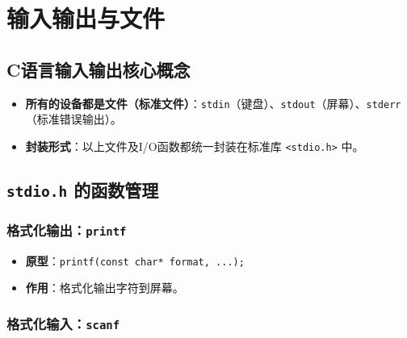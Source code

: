 \clearpage
\begingroup
\let\clearpage\relax
\let\cleardoublepage\relax
\vspace*{\fill}
\chapter{输入输出与文件}
\vspace*{\fill}
\endgroup
\clearpage


\section{C语言输入输出核心概念}

\begin{itemize}
    \item \textbf{所有的设备都是文件（标准文件）}：\texttt{stdin}（键盘）、\texttt{stdout}（屏幕）、\texttt{stderr}（标准错误输出）。
    \item \textbf{封装形式}：以上文件及I/O函数都统一封装在标准库 \texttt{<stdio.h>} 中。
\end{itemize}

\section{\texorpdfstring{\texttt{stdio.h} 的函数管理}{stdio.h 的函数管理}}

\subsection{格式化输出：\texttt{printf}}

\begin{itemize}
    \item \textbf{原型}：\texttt{printf(const char* format, ...);}
    \item \textbf{作用}：格式化输出字符到屏幕。
\end{itemize}

\subsection{格式化输入：\texttt{scanf}}

